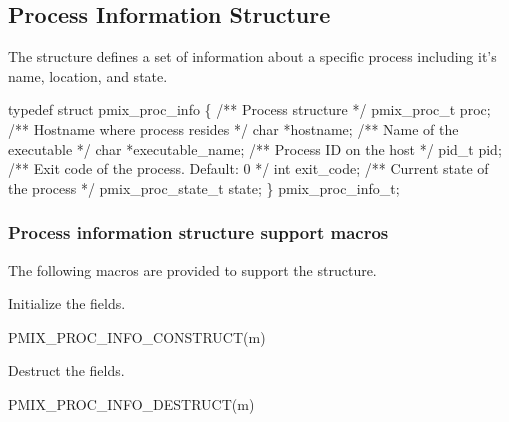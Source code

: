 \subsection{Process Information Structure}

The  structure defines a set of information about a specific process including it's name, location, and state.

\cspecificstart
\begin{codepar}
typedef struct pmix_proc_info \{
    /** Process structure */
    pmix_proc_t proc;
    /** Hostname where process resides */
    char *hostname;
    /** Name of the executable */
    char *executable_name;
    /** Process ID on the host */
    pid_t pid;
    /** Exit code of the process. Default: 0 */
    int exit_code;
    /** Current state of the process */
    pmix_proc_state_t state;
\} pmix_proc_info_t;
\end{codepar}
\cspecificend


\subsubsection{Process information structure support macros}

The following macros are provided to support the  structure.


Initialize the  fields.

\cspecificstart
\begin{codepar}
PMIX_PROC_INFO_CONSTRUCT(m)
\end{codepar}
\cspecificend

\begin{arglist}
\end{arglist}


Destruct the  fields.

\cspecificstart
\begin{codepar}
PMIX_PROC_INFO_DESTRUCT(m)
\end{codepar}
\cspecificend

